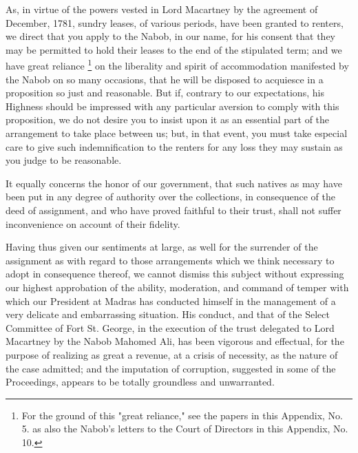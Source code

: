 As, in virtue of the powers vested in Lord Macartney by the agreement of December, 1781, sundry leases, of various periods, have been granted to renters, we direct that you apply to the Nabob, in our name, for his consent that they may be permitted to hold their leases to the end of the stipulated term; and we have great reliance
\footnote{ For the ground of this "great reliance," see the papers in this Appendix, No. 5. as also the Nabob's letters to the Court of Directors in this Appendix, No. 10.}
 on the liberality and spirit of accommodation manifested by the Nabob on so many occasions, that he will be disposed to acquiesce in a proposition so just and reasonable. But if, contrary to our expectations, his Highness should be impressed with any particular aversion to comply with this proposition, we do not desire you to insist upon it as an essential part of the arrangement to take place between us; but, in that event, you must take especial care to give such indemnification to the renters for any loss they may sustain as you judge to be reasonable.

It equally concerns the honor of our government, that such natives as may have been put in any degree of authority over the collections, in consequence of the deed of assignment, and who have proved faithful to their trust, shall not suffer inconvenience on account of their fidelity.

Having thus given our sentiments at large, as well for the surrender of the assignment as with regard to those arrangements which we think necessary to adopt in consequence thereof, we cannot dismiss this subject without expressing our highest approbation of the ability, moderation, and command of temper with which our President at Madras has conducted himself in the management of a very delicate and embarrassing situation. His conduct, and that of the Select Committee of Fort St. George, in the execution of the trust delegated to Lord Macartney by the Nabob Mahomed Ali, has been vigorous and effectual, for the purpose of realizing as great a revenue, at a crisis of necessity, as the nature of the case admitted; and the imputation of corruption, suggested in some of the Proceedings, appears to be totally groundless and unwarranted.

